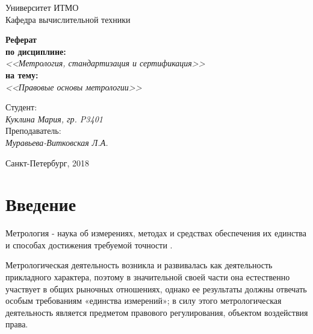 \documentclass[14pt, a4paper] {ncc}
\begin{document}
\setcounter{figure}{0}
\frenchspacing
\pagestyle{empty}
\begin{center}
                            Университет ИТМО    \\
                        Кафедра вычислительной техники


\end{center}
\begin{center}
				{\bf		Реферат \\
					по дисциплине:\\}
				{\it <<Метрология, стандартизация и сертификация>>\\}
				{\bf	на тему:\\ }
				{\it <<Правовые основы метрологии>>}
\end{center}
\begin{flushright}
                                    Студент:\\
                                    {\it Куклина Мария, гр. P3401}\\
                                    Преподаватель: \\
                                    {\it Муравьева-Витковская Л.А.}
\end{flushright}
\begin{center}
                             Санкт-Петербург, 2018
\end{center}
\newpage
\pagestyle{plain}
\setcounter{page}{2}
\tableofcontents

\newpage
\section{Введение}

       Метрология - наука об измерениях, методах и средствах обеспечения их
       единства и способах достижения требуемой точности \cite{micromake}.

       Метрологическая деятельность возникла и развивалась как деятельность
       прикладного характера, поэтому в значительной своей части она естественно
       участвует в общих рыночных отношениях, однако ее результаты должны отвечать
       особым требованиям «единства измерений»; в силу этого метрологическая
       деятельность является предметом правового регулирования, объектом воздействия
       права.
\end{document}
